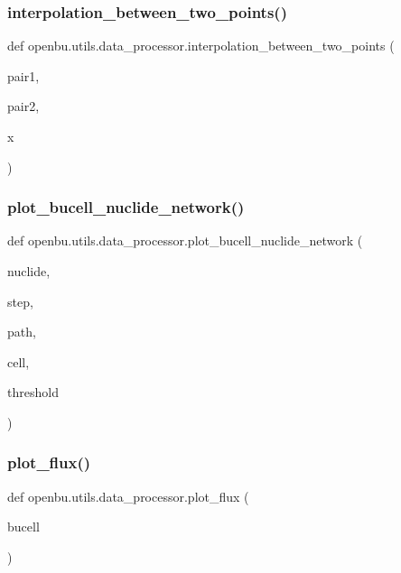 \subsubsection{\texorpdfstring{interpolation\+\_\+between\+\_\+two\+\_\+points()}{interpolation\_between\_two\_points()}}
{\footnotesize\ttfamily def openbu.\+utils.\+data\+\_\+processor.\+interpolation\+\_\+between\+\_\+two\+\_\+points (\begin{DoxyParamCaption}\item[{}]{pair1,  }\item[{}]{pair2,  }\item[{}]{x }\end{DoxyParamCaption})}

\mbox{\label{namespaceopenbu_1_1utils_1_1data__processor_a6c9f7239290a46bec83768499c9e1068}} 
\subsubsection{\texorpdfstring{plot\+\_\+bucell\+\_\+nuclide\+\_\+network()}{plot\_bucell\_nuclide\_network()}}
{\footnotesize\ttfamily def openbu.\+utils.\+data\+\_\+processor.\+plot\+\_\+bucell\+\_\+nuclide\+\_\+network (\begin{DoxyParamCaption}\item[{}]{nuclide,  }\item[{}]{step,  }\item[{}]{path,  }\item[{}]{cell,  }\item[{}]{threshold }\end{DoxyParamCaption})}

\mbox{\label{namespaceopenbu_1_1utils_1_1data__processor_ae500bc45f1276ef3dc3b9668a5c081ac}} 
\subsubsection{\texorpdfstring{plot\+\_\+flux()}{plot\_flux()}}
{\footnotesize\ttfamily def openbu.\+utils.\+data\+\_\+processor.\+plot\+\_\+flux (\begin{DoxyParamCaption}\item[{}]{bucell }\end{DoxyParamCaption})}

